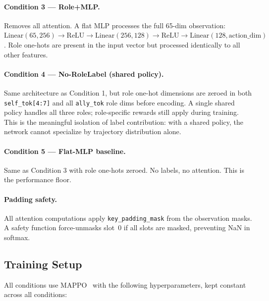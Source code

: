 \paragraph{Condition 3 --- Role+MLP.}
Removes all attention. A flat MLP processes the full 65-dim observation: $\text{Linear}(65, 256) \to \text{ReLU} \to \text{Linear}(256, 128) \to \text{ReLU} \to \text{Linear}(128, \text{action\_dim})$. Role one-hots are present in the input vector but processed identically to all other features.

\paragraph{Condition 4 --- No-RoleLabel (shared policy).}
Same architecture as Condition 1, but role one-hot dimensions are zeroed in both \texttt{self\_tok[4:7]} and all \texttt{ally\_tok} role dims before encoding. A single shared policy handles all three roles; role-specific rewards still apply during training. This is the meaningful isolation of label contribution: with a shared policy, the network cannot specialize by trajectory distribution alone.

\paragraph{Condition 5 --- Flat-MLP baseline.}
Same as Condition 3 with role one-hots zeroed. No labels, no attention. This is the performance floor.

\paragraph{Padding safety.}
All attention computations apply \texttt{key\_padding\_mask} from the observation masks. A safety function force-unmasks slot~0 if all slots are masked, preventing NaN in softmax.

\subsection{Training Setup}

All conditions use MAPPO~\cite{mappo} with the following hyperparameters, kept constant across all conditions:

